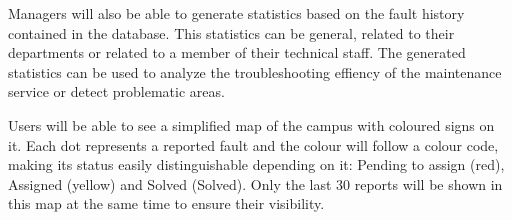 Managers will also be able to generate statistics based on the fault history contained in the database. This statistics can be general, related to their departments or related to a member of their technical staff. The generated statistics can be used to analyze the troubleshooting effiency of the maintenance service or detect problematic areas.

Users will be able to see a simplified map of the campus with coloured signs on it. Each dot represents a reported fault and the colour will follow a colour code, making its status easily distinguishable depending on it: Pending to assign (red), Assigned (yellow) and Solved (Solved). Only the last 30 reports will be shown in this map at the same time to ensure their visibility.

